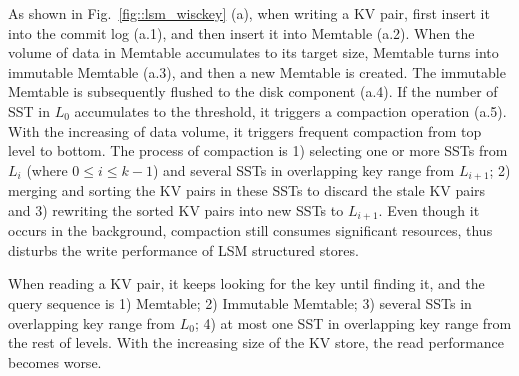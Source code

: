 \documentclass[sigconf]{acmart}
\begin{document}
As shown in Fig.~\ref{fig::lsm_wisckey} (a), when writing a KV pair, first insert it into the commit log (a.1), and then insert it into Memtable (a.2). When the volume of data in Memtable accumulates to its target size, Memtable turns into immutable Memtable (a.3), and then a new Memtable is created. The immutable Memtable is subsequently flushed to the disk component (a.4). If the number of SST in $L_0$ accumulates to the threshold, it triggers a compaction operation (a.5). With the increasing of data volume, it triggers frequent compaction from top level to bottom. The process of compaction is 1) selecting one or more SSTs from $L_i$ (where 0$\le$$i$$\le$$k-1$)  and several SSTs in overlapping key range from $L_{i+1}$; 2) merging and sorting the KV pairs in these SSTs to discard the stale KV pairs and 3) rewriting the sorted KV pairs into new SSTs to $L_{i+1}$. Even though it occurs in the background, compaction still consumes significant resources, thus disturbs the write performance of LSM structured stores.

When reading a KV pair, it keeps looking for the key until finding it, and the query sequence is 1) Memtable; 2) Immutable Memtable; 3) several SSTs in overlapping key range from $L_0$; 4) at most one SST in overlapping key range from the rest of levels. With the increasing size of the KV store, the read performance becomes worse.



\end{document}
